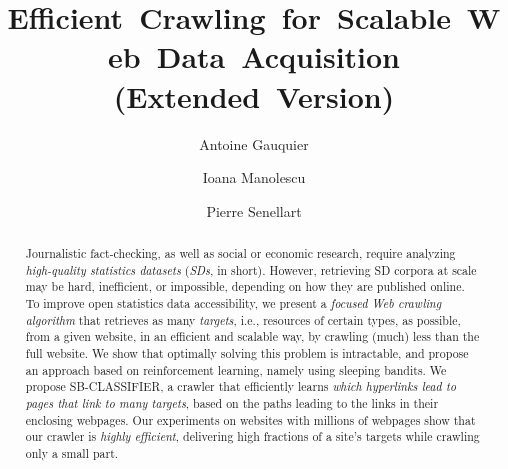 \documentclass[sigconf,nonacm]{acmart}
\newcommand{\0}{\phantom{0}}
\begin{document}
\newcommand{\extVersion}{false}

\newcommand{\printIfExtVersion}[2]%
{%
	\ifthenelse{\equal{\extVersion}{true}}{#1}{}%
	\ifthenelse{\equal{\extVersion}{false}}{#2}{}%
}

\title{Efficient~Crawling~for~Scalable~Web~Data~Acquisition (Extended~Version)}

\author{Antoine Gauquier}

\author{Ioana Manolescu}

\author{Pierre Senellart}



\begin{abstract}
  Journalistic fact-checking, as well as social or economic research,
  require analyzing \emph{high-quality statistics datasets} (\emph{SDs}, in short).
  However, retrieving  SD corpora at scale may be hard, inefficient, or impossible,
  depending on how they are published online.
	To improve open statistics data accessibility, we present a \emph{focused Web crawling
  algorithm} that retrieves  as many \emph{targets}, i.e., resources of certain types,
  as possible, from a given website, in an efficient and scalable way, by crawling (much)
  less than the full website.  We show that optimally solving this problem is intractable,
  and propose an approach based on reinforcement learning, namely using sleeping bandits.
  We propose \textsf{\small SB-CLASSIFIER}, a crawler that  efficiently learns \emph{which
  hyperlinks lead to pages that link to many targets}, based on the paths leading to the
  links in their enclosing webpages. Our experiments on websites with millions of webpages
  show that our crawler is \emph{highly efficient}, delivering high fractions of a site's
  targets while crawling only a small part.
\end{abstract}


\maketitle
\end{document}
